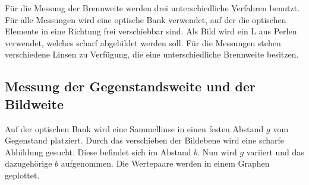 Für die Messung der Brennweite werden drei unterschiedliche Verfahren benutzt.
Für alle Messungen wird eine optische Bank verwendet, auf der die optischen Elemente in eine Richtung frei verschiebbar sind.
Als Bild wird ein L aus Perlen verwendet, welches scharf abgebildet werden soll. Für die Messungen stehen verschiedene Linsen zu Verfügung,
die eine unterschiedliche Brennweite besitzen.
\subsection{Messung der Gegenstandsweite und der Bildweite}
Auf der optischen Bank wird eine Sammellinse in einen festen Abstand $g$ vom Gegenstand platziert.
Durch das verschieben der Bildebene wird eine scharfe Abbildung gesucht. Diese befindet sich im Abstand $b$.
Nun wird $g$ variiert und das dazugehörige $b$ aufgenommen. Die Wertepaare werden in einem Graphen geplottet.
